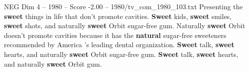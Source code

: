 \begin{textsample}{NEG Dim 4 – 1980 – Score -2.00 – 1980/tv\_com\_1980\_103.txt}  \label{ex:f4_neg_033}
Presenting the \textbf{sweet} things in life that don't promote cavities. \textbf{Sweet} kids, \textbf{sweet} smiles, \textbf{sweet} shots, and naturally \textbf{sweet} Orbit sugar-free gum.
Naturally \textbf{sweet} Orbit doesn't promote cavities because it has the \textbf{natural} sugar-free sweeteners recommended by America 's leading dental organization. \textbf{Sweet} talk, \textbf{sweet} hearts, and naturally \textbf{sweet} Orbit sugar-free gum. \textbf{Sweet} talk, \textbf{sweet} hearts, and naturally \textbf{sweet} Orbit gum.

\end{textsample}
